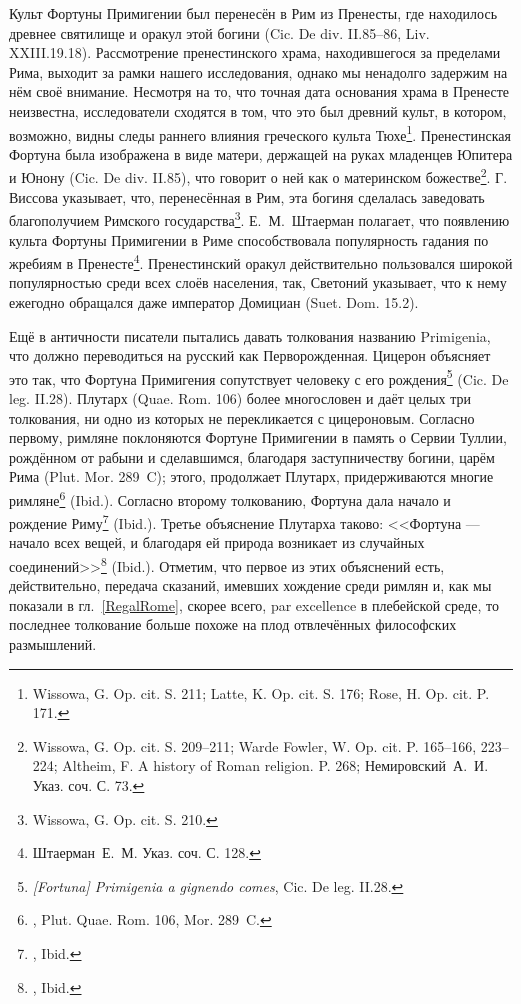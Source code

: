Культ Фортуны Примигении был перенесён в Рим из Пренесты, где находилось древнее святилище и оракул этой богини (Cic. De div. II.85--86, Liv. XXIII.19.18). Рассмотрение пренестинского храма, находившегося за пределами Рима, выходит за рамки нашего исследования, однако мы ненадолго задержим на нём своё внимание. Несмотря на то, что точная дата основания храма в Пренесте неизвестна, исследователи сходятся в том, что это был древний культ, в котором, возможно, видны следы раннего влияния греческого культа Тюхе\footnote{Wissowa, G. Op. cit. S. 211; Latte, K. Op. cit. S. 176; Rose, H. Op. cit. P. 171.}. Пренестинская Фортуна была изображена в виде матери, держащей на руках младенцев Юпитера и Юнону (Cic. De div. II.85), что говорит о ней как о материнском божестве\footnote{Wissowa, G. Op. cit. S. 209--211; Warde Fowler, W. Op. cit. P. 165--166, 223--224; Altheim, F. A history of Roman religion. P. 268; Немировский~А.~И. Указ. соч. С. 73.}. Г. Виссова указывает, что, перенесённая в Рим, эта богиня сделалась заведовать благополучием Римского государства\footnote{Wissowa, G. Op. cit. S. 210.}. Е.~М.~Штаерман полагает, что появлению культа Фортуны Примигении в Риме способствовала популярность гадания по жребиям в Пренесте\footnote{Штаерман~Е.~М. Указ. соч. С. 128.}. Пренестинский оракул действительно пользовался широкой популярностью среди всех слоёв населения, так, Светоний указывает, что к нему ежегодно обращался даже император Домициан (Suet. Dom. 15.2).

Ещё в античности писатели пытались давать толкования названию Primigenia, что должно переводиться на русский как Перворожденная. Цицерон объясняет это так, что Фортуна Примигения сопутствует человеку с его рождения\footnote{\textit{[Fortuna] Primigenia a gignendo comes}, Cic. De leg. II.28.} (Cic. De leg. II.28). Плутарх (Quae. Rom. 106) более многословен и даёт целых три толкования, ни одно из которых не перекликается с цицероновым. Согласно первому, римляне поклоняются Фортуне Примигении в память о Сервии Туллии, рождённом от рабыни и сделавшимся, благодаря заступничеству богини, царём Рима (Plut. Mor. 289~C); этого, продолжает Плутарх, придерживаются многие римляне\footnote{, Plut. Quae. Rom. 106, Mor. 289~C.} (Ibid.). Согласно второму толкованию, Фортуна дала начало и рождение Риму\footnote{, Ibid.} (Ibid.). Третье объяснение Плутарха таково: <<Фортуна — начало всех вещей, и благодаря ей природа возникает из случайных соединений>>\footnote{, Ibid.} (Ibid.). Отметим, что первое из этих объяснений есть, действительно, передача сказаний, имевших хождение среди римлян и, как мы показали в гл.~\ref{RegalRome}, скорее всего, par excellence в плебейской среде, то последнее толкование больше похоже на плод отвлечённых философских размышлений.

